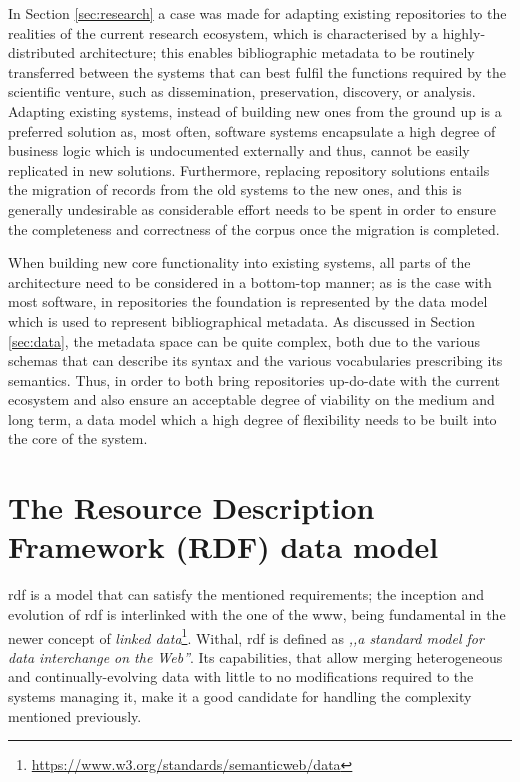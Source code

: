 In Section \ref{sec:research} a case was made for adapting existing repositories to the realities of the current research ecosystem, which is characterised by a highly-distributed architecture; this enables bibliographic metadata to be routinely transferred between the systems that can best fulfil the functions required by the scientific venture, such as dissemination, preservation, discovery, or analysis. Adapting existing systems, instead of building new ones from the ground up is a preferred solution as, most often, software systems encapsulate a high degree of business logic which is undocumented externally and thus, cannot be easily replicated in new solutions. Furthermore, replacing repository solutions entails the migration of records from the old systems to the new ones, and this is generally undesirable as considerable effort needs to be spent in order to ensure the completeness and correctness of the corpus once the migration is completed.

When building new core functionality into existing systems, all parts of the architecture need to be considered in a bottom-top manner; as is the case with most software, in repositories the foundation is represented by the data model which is used to represent bibliographical metadata. As discussed in Section \ref{sec:data}, the metadata space can be quite complex, both due to the various schemas that can describe its syntax and the various vocabularies prescribing its semantics. Thus, in order to both bring repositories up-do-date with the current ecosystem and also ensure an acceptable degree of viability on the medium and long term, a data model which a high degree of flexibility needs to be built into the core of the system.

\section{The Resource Description Framework (RDF) data model}
\label{sec:rdf}

\gls{rdf} is a model that can satisfy the mentioned requirements; the inception and evolution of \gls{rdf} is interlinked with the one of the \gls{www}, being fundamental in the newer concept of \emph{linked data}\footnote{\url{https://www.w3.org/standards/semanticweb/data}}. Withal, \gls{rdf} is defined as \emph{,,a standard model for data interchange on the Web''}\cite{rdf}. Its capabilities, that allow merging heterogeneous and continually-evolving data with little to no modifications required to the systems managing it, make it a good candidate for handling the complexity mentioned previously. 

